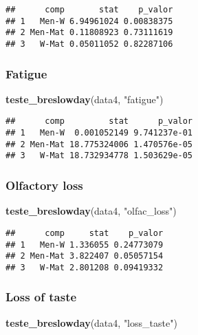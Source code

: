 \documentclass[
]{article}
\newenvironment{Shaded}{\begin{snugshade}}{\end{snugshade}}
\newcommand{\KeywordTok}[1]{\textcolor[rgb]{0.13,0.29,0.53}{\textbf{#1}}}
\newcommand{\NormalTok}[1]{#1}
\newcommand{\StringTok}[1]{\textcolor[rgb]{0.31,0.60,0.02}{#1}}
\begin{document}
\begin{verbatim}
##      comp       stat    p_valor
## 1   Men-W 6.94961024 0.00838375
## 2 Men-Mat 0.11808923 0.73111619
## 3   W-Mat 0.05011052 0.82287106
\end{verbatim}

\hypertarget{fatigue-3}{%
\subsubsection{Fatigue}\label{fatigue-3}}

\begin{Shaded}
\begin{Highlighting}[]
\KeywordTok{teste_breslowday}\NormalTok{(data4, }\StringTok{"fatigue"}\NormalTok{)}
\end{Highlighting}
\end{Shaded}

\begin{verbatim}
##      comp         stat      p_valor
## 1   Men-W  0.001052149 9.741237e-01
## 2 Men-Mat 18.775324006 1.470576e-05
## 3   W-Mat 18.732934778 1.503629e-05
\end{verbatim}

\hypertarget{olfactory-loss-3}{%
\subsubsection{Olfactory loss}\label{olfactory-loss-3}}

\begin{Shaded}
\begin{Highlighting}[]
\KeywordTok{teste_breslowday}\NormalTok{(data4, }\StringTok{"olfac_loss"}\NormalTok{)}
\end{Highlighting}
\end{Shaded}

\begin{verbatim}
##      comp     stat    p_valor
## 1   Men-W 1.336055 0.24773079
## 2 Men-Mat 3.822407 0.05057154
## 3   W-Mat 2.801208 0.09419332
\end{verbatim}

\hypertarget{loss-of-taste-3}{%
\subsubsection{Loss of taste}\label{loss-of-taste-3}}

\begin{Shaded}
\begin{Highlighting}[]
\KeywordTok{teste_breslowday}\NormalTok{(data4, }\StringTok{"loss_taste"}\NormalTok{)}
\end{Highlighting}
\end{Shaded}
\end{document}
